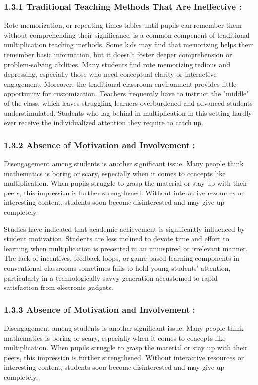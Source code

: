 \documentclass[BTech]{audiss}
\begin{document}
\subsubsection{1.3.1 Traditional Teaching Methods That Are Ineffective :}
Rote memorization, or repeating times tables until pupils can remember them without comprehending their significance, is a common component of traditional multiplication teaching methods. Some kids may find that memorizing helps them remember basic information, but it doesn't foster deeper comprehension or problem-solving abilities. Many students find rote memorizing tedious and depressing, especially those who need conceptual clarity or interactive engagement. Moreover, the traditional classroom environment provides little opportunity for customization. Teachers frequently have to instruct the "middle" of the class, which leaves struggling learners overburdened and advanced students understimulated. Students who lag behind in multiplication in this setting hardly ever receive the individualized attention they require to catch up.

\subsubsection{1.3.2 Absence of Motivation and Involvement :}
Disengagement among students is another significant issue. Many people think mathematics is boring or scary, especially when it comes to concepts like multiplication. When pupils struggle to grasp the material or stay up with their peers, this impression is further strengthened. Without interactive resources or interesting content, students soon become disinterested and may give up completely. 

Studies have indicated that academic achievement is significantly influenced by student motivation. Students are less inclined to devote time and effort to learning when multiplication is presented in an uninspired or irrelevant manner. The lack of incentives, feedback loops, or game-based learning components in conventional classrooms sometimes fails to hold young students' attention, particularly in a technologically savvy generation accustomed to rapid satisfaction from electronic gadgets.

\subsubsection{1.3.3 Absence of Motivation and Involvement :}
Disengagement among students is another significant issue. Many people think mathematics is boring or scary, especially when it comes to concepts like multiplication. When pupils struggle to grasp the material or stay up with their peers, this impression is further strengthened. Without interactive resources or interesting content, students soon become disinterested and may give up completely. 
\end{document}
